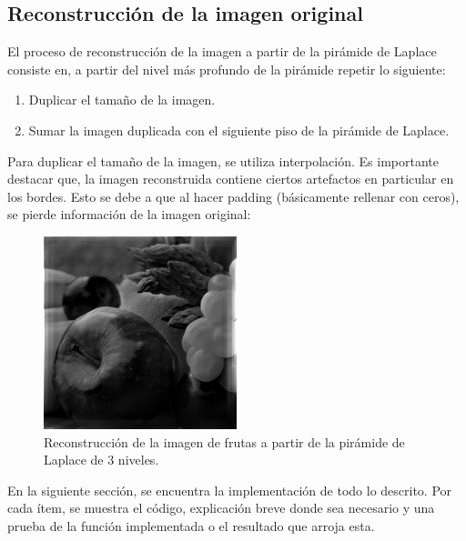 \documentclass[12pt, letterpaper]{article}
\begin{document}
\subsection{Reconstrucción de la imagen original} \label{reconstimagensection}
El proceso de reconstrucción de la imagen a partir de la pirámide de Laplace consiste en, a partir del nivel más profundo de la pirámide repetir lo siguiente:
\begin{enumerate}
  \item Duplicar el tamaño de la imagen.
  \item Sumar la imagen duplicada con el siguiente piso de la pirámide de Laplace. 
\end{enumerate}

\par Para duplicar el tamaño de la imagen, se utiliza interpolación. Es importante destacar que, la imagen reconstruida contiene ciertos artefactos en particular en los bordes. Esto se debe a que al hacer padding (básicamente rellenar con ceros), se pierde información de la imagen original: 


\begin{figure}[H]
  \centering
  \includegraphics[width = 0.5\textwidth]{frutas_recons.png}  
  \caption{Reconstrucción de la imagen de frutas a partir de la pirámide de Laplace de 3 niveles.}
  \label{fig:frutasRec}
\end{figure}

\vspace{7cm}
\hrulefill
\par En la siguiente sección, se encuentra la implementación de todo lo descrito.  Por cada ítem, se muestra el código, explicación breve donde sea necesario y una prueba de la función implementada o el resultado que arroja esta. 
 
\end{document}
